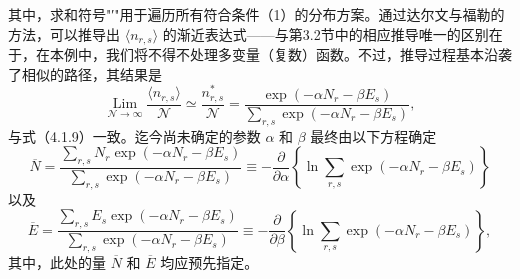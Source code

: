 其中，求和符号"′"用于遍历所有符合条件（1）的分布方案。通过达尔文与福勒的方法，可以推导出 \(\langle n_{r,s}\rangle\) 的渐近表达式——与第3.2节中的相应推导唯一的区别在于，在本例中，我们将不得不处理多变量（复数）函数。不过，推导过程基本沿袭了相似的路径，其结果是
\begin{equation}\tag{4.2.7}\label{eq:4.2.7}
\operatorname* { L i m } _ { \mathcal { N } \to \infty } \frac { \langle n _ { r , s } \rangle } { \mathcal { N } } \simeq \frac { n _ { r , s } ^{*} } { \mathcal { N } } = \frac { \exp { ( - \alpha N _ { r } - \beta E _ { s } ) } } { \sum _ { r , s } \exp { ( - \alpha N _ { r } - \beta E _ { s } ) } } ,
\end{equation}
与式（4.1.9）一致。迄今尚未确定的参数 \(\alpha\) 和 \(\beta\) 最终由以下方程确定
\begin{equation}\tag{4.2.8}\label{eq:4.2.8}
\overline { { N } } = \frac { \sum _ { r , s } N _ { r } \exp { ( - \alpha N _ { r } - \beta E _ { s } ) } } { \sum _ { r , s } \exp { ( - \alpha N _ { r } - \beta E _ { s } ) } } \equiv - \frac { \partial } { \partial \alpha } \left\{ \ln \sum _ { r , s } \exp { ( - \alpha N _ { r } - \beta E _ { s } ) } \right\}
\end{equation}
以及
\begin{equation}\tag{4.2.9}\label{eq:4.2.9}
\overline { { E } } = \frac { \sum _ { r , s } E _ { s } \exp { ( - \alpha N _ { r } - \beta E _ { s } ) } } { \sum _ { r , s } \exp { ( - \alpha N _ { r } - \beta E _ { s } ) } } \equiv - \frac { \partial } { \partial \beta } \left\{ \ln \sum _ { r , s } \exp { ( - \alpha N _ { r } - \beta E _ { s } ) } \right\} ,
\end{equation}
其中，此处的量 \(\overline{N}\) 和 \(\overline{E}\) 均应预先指定。
